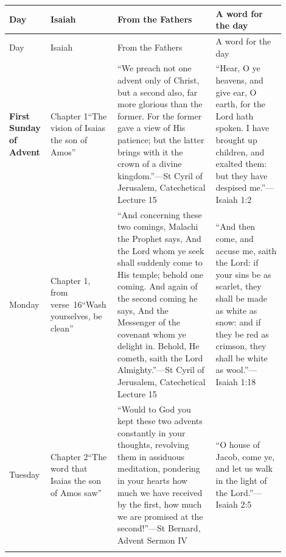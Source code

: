 {\footnotesize
\begin{longtable}{@{}>{\raggedright\arraybackslash}p{0.11\linewidth}>{\raggedright\arraybackslash}p{0.21\linewidth}>{\raggedright\arraybackslash}p{0.34\linewidth}>{\raggedright\arraybackslash}p{0.24\linewidth}@{}}
\toprule
Day & Isaiah & From the Fathers & A word for the day\\
\midrule
\endfirsthead
\toprule
Day & Isaiah & From the Fathers & A word for the day\\
\midrule
\endhead
\textbf{First Sunday of Advent} &
Chapter 1\newline ``The vision of Isaias the son of Amos'' &
``We preach not one advent only of Christ, but a second also, far more glorious than the former. For the former gave a view of His patience; but the latter brings with it the crown of a divine kingdom.''\newline---St Cyril of Jerusalem, Catechetical Lecture 15 &
``Hear, O ye heavens, and give ear, O earth, for the Lord hath spoken. I have brought up children, and exalted them: but they have despised me.''\newline---Isaiah 1:2\\
\addlinespace
Monday &
Chapter 1, from verse~16\newline ``Wash yourselves, be clean'' &
``And concerning these two comings, Malachi the Prophet says, And the Lord whom ye seek shall suddenly come to His temple; behold one coming. And again of the second coming he says, And the Messenger of the covenant whom ye delight in. Behold, He cometh, saith the Lord Almighty.''\newline---St Cyril of Jerusalem, Catechetical Lecture 15 &
``And then come, and accuse me, saith the Lord: if your sins be as scarlet, they shall be made as white as snow: and if they be red as crimson, they shall be white as wool.''\newline---Isaiah 1:18\\
\addlinespace
Tuesday &
Chapter 2\newline ``The word that Isaias the son of Amos saw'' &
``Would to God you kept these two advents constantly in your thoughts, revolving them in assiduous meditation, pondering in your hearts how much we have received by the first, how much we are promised at the second!''\newline---St Bernard, Advent Sermon IV &
``O house of Jacob, come ye, and let us walk in the light of the Lord.''\newline---Isaiah 2:5\\
\addlinespace

\end{longtable}}
